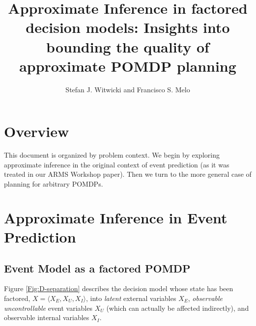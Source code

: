 \documentclass[10pt]{article}
\title{Approximate Inference in factored decision models: Insights into bounding the quality of approximate POMDP planning}
\author{Stefan J. Witwicki and Francisco S. Melo}
\begin{document}
\newtheorem{definition}{Definition}
\newtheorem{theorem}{Theorem}

\maketitle

\section{Overview}

This document is organized by problem context.  We begin by exploring approximate inference in the original context of event prediction (as it was treated in our ARMS Workshop paper).  Then we turn to the more general case of planning for arbitrary POMDPs.

\section{Approximate Inference in Event Prediction}

\subsection{Event Model as a factored POMDP}

Figure \ref{Fig:D-separation} describes the decision model whose state has been factored, $X=\langle X_{E}, X_{U}, X_{I}\rangle$,  into \emph{latent} external variables $X_{E}$, \emph{observable} \emph{uncontrollable} event variables $X_{U}$ (which can actually be affected indirectly), and observable internal variables $X_{I}$.
\end{document}
